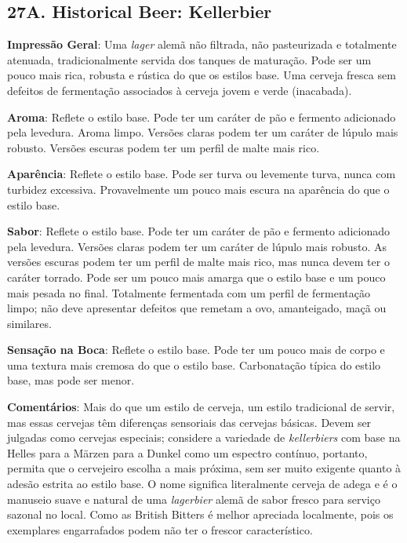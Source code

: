 \subsection*{27A. Historical Beer: Kellerbier}
\textbf{Impressão Geral}: Uma \textit{lager} alemã não filtrada, não pasteurizada e totalmente atenuada, tradicionalmente servida dos tanques de maturação. Pode ser um pouco mais rica, robusta e rústica do que os estilos base. Uma cerveja fresca sem defeitos de fermentação associados à cerveja jovem e verde (inacabada).

\textbf{Aroma}: Reflete o estilo base. Pode ter um caráter de pão e fermento adicionado pela levedura. Aroma limpo. Versões claras podem ter um caráter de lúpulo mais robusto. Versões escuras podem ter um perfil de malte mais rico.

\textbf{Aparência}: Reflete o estilo base. Pode ser turva ou levemente turva, nunca com turbidez excessiva. Provavelmente um pouco mais escura na aparência do que o estilo base.

\textbf{Sabor}: Reflete o estilo base. Pode ter um caráter de pão e fermento adicionado pela levedura. Versões claras podem ter um caráter de lúpulo mais robusto. As versões escuras podem ter um perfil de malte mais rico, mas nunca devem ter o caráter torrado. Pode ser um pouco mais amarga que o estilo base e um pouco mais pesada no final. Totalmente fermentada com um perfil de fermentação limpo; não deve apresentar defeitos que remetam a ovo, amanteigado, maçã ou similares.

\textbf{Sensação na Boca}: Reflete o estilo base. Pode ter um pouco mais de corpo e uma textura mais cremosa do que o estilo base. Carbonatação típica do estilo base, mas pode ser menor.

\textbf{Comentários}: Mais do que um estilo de cerveja, um estilo tradicional de servir, mas essas cervejas têm diferenças sensoriais das cervejas básicas. Devem ser julgadas como cervejas especiais; considere a variedade de \textit{kellerbiers} com base na Helles para a Märzen para a Dunkel como um espectro contínuo, portanto, permita que o cervejeiro escolha a mais próxima, sem ser muito exigente quanto à adesão estrita ao estilo base. O nome significa literalmente cerveja de adega e é o manuseio suave e natural de uma \textit{lagerbier} alemã de sabor fresco para serviço sazonal no local. Como as British Bitters é melhor apreciada localmente, pois os exemplares engarrafados podem não ter o frescor característico.

